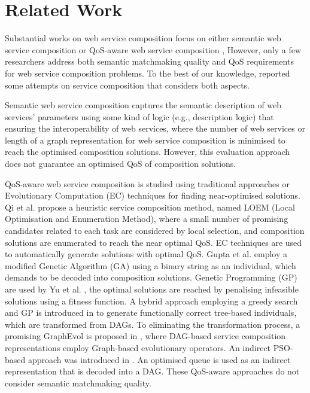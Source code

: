 \documentclass{llncs}
\begin{document}
\section{Related Work} \label{relatedWork}
Substantial works on web service composition focus on either semantic web service composition \cite{bansal2016generalized,boustil2014semantic,mier2015integrated} or QoS-aware web service composition \cite{gupta2015optimization,ma2015hybrid,qi2010combining,da2016particle,da2015graphevol,yu2013adaptive}, However, only a few researchers address both semantic matchmaking quality and QoS requirements for web service composition problems. To the best of our knowledge, \cite{fanjiang2014semantic,lecue2009optimizing,pop2009immune} reported some attempts on service composition that considers both aspects.

Semantic web service composition \cite{bansal2016generalized,boustil2014semantic,mier2015integrated} captures the semantic description of web services' parameters using some kind of logic (e.g., description logic) that ensuring the interoperability of web services, where the number of web services or length of a graph representation for web service composition is minimised to reach the optimised composition solutions. However, this evaluation approach does not guarantee an optimised QoS of composition solutions.

QoS-aware web service composition is studied using traditional approaches or Evolutionary Computation (EC) techniques for finding near-optimised solutions. Qi et al. \cite{qi2010combining} propose a heuristic service composition method, named LOEM (Local Optimisation and Enumeration Method), where a small number of promising candidates related to each task are considered by local selection, and composition solutions are enumerated to reach the near optimal QoS. EC techniques are used to automatically generate solutions with optimal QoS. Gupta et al. \cite{gupta2015optimization} employ a modified Genetic Algorithm (GA) using a binary string as an individual, which demands to be decoded into composition solutions. Genetic Programming (GP) are used by Yu et al. \cite{yu2013adaptive}, the optimal solutions are reached by penalising infeasible solutions using a fitness function. A hybrid approach employing a greedy search and GP is introduced in \cite{ma2015hybrid} to generate functionally correct tree-based individuals, which are transformed from DAGs. To eliminating the transformation process, a promising GraphEvol is proposed in \cite{da2015graphevol}, where DAG-based service composition representations employ Graph-based evolutionary operators. An indirect PSO-based approach was introduced in \cite{da2016particle}. An optimised queue is used as an indirect representation that is decoded into a DAG. These QoS-aware approaches \cite{gupta2015optimization,qi2010combining,ma2015hybrid,da2016particle,da2015graphevol,yu2013adaptive} do not consider semantic matchmaking quality.
\end{document}
